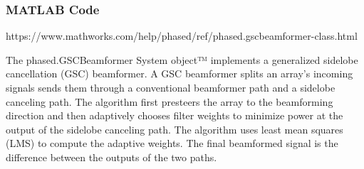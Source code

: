 \documentclass{beamer}
\begin{document}
\begin{frame}
  \frametitle{MATLAB Code}

  https://www.mathworks.com/help/phased/ref/phased.gscbeamformer-class.html
  
  The phased.GSCBeamformer System object™ implements a generalized sidelobe cancellation (GSC) beamformer. A GSC beamformer splits an array's incoming signals sends them through a conventional beamformer path and a sidelobe canceling path. The algorithm first presteers the array to the beamforming direction and then adaptively chooses filter weights to minimize power at the output of the sidelobe canceling path. The algorithm uses least mean squares (LMS) to compute the adaptive weights. The final beamformed signal is the difference between the outputs of the two paths.

  
\end{frame}
\end{document}
